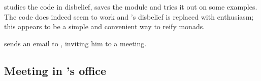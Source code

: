 %    

\docname{} studies the code in disbelief, saves the module and tries
it out on some examples. The code does indeed seem to work and
\docname{}'s disbelief is replaced with enthusiasm; this appears to be
a simple and convenient way to reify monads.

\docname{} sends an email to \studname{}, inviting him to a meeting. 

\subsection{Meeting in \docname{}'s office} %


